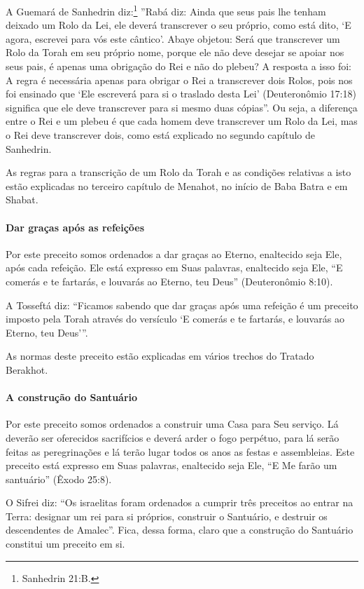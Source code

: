 A Guemará de Sanhedrin diz:\footnote{Sanhedrin 21:B.} ''Rabá diz: Ainda que
seus pais lhe tenham deixado um Rolo da Lei, ele deverá transcrever o seu próprio,
como está dito, `E agora, escrevei para vós este cântico'. Abaye
objetou: Será que transcrever um Rolo da Torah em seu próprio nome,
porque ele não deve desejar se apoiar nos seus pais, é apenas uma
obrigação do Rei e não do plebeu? A resposta a isso foi: A regra é
necessária apenas para obrigar o Rei a transcrever dois Rolos, pois nos
foi ensinado que `Ele escreverá para si o traslado desta Lei'
(Deuteronômio 17:18) significa que ele deve transcrever para si mesmo
duas cópias''. Ou seja, a diferença entre o Rei e um plebeu é que cada
homem deve transcrever um Rolo da Lei, mas o Rei deve transcrever dois,
como está explicado no segundo capítulo de Sanhedrin.

As regras para a transcrição de um Rolo da Torah e as condições
relativas a isto estão explicadas no terceiro capítulo de Menahot, no
início de Baba Batra e em Shabat.

\paragraph{Dar graças após as refeições}

Por este preceito somos ordenados a dar graças ao Eterno, enaltecido
seja Ele, após cada refeição. Ele está expresso em Suas palavras,
enaltecido seja Ele, ``E comerás e te fartarás, e louvarás ao Eterno,
teu Deus'' (Deuteronômio 8:10).

A Tosseftá diz: ``Ficamos sabendo que dar graças após uma refeição é um
preceito imposto pela Torah através do versículo `E comerás e te
fartarás, e louvarás ao Eterno, teu Deus'''.

As normas deste preceito estão explicadas em vários trechos do Tratado
Berakhot.

\paragraph{A construção do Santuário}

Por este preceito somos ordenados a construir uma Casa para Seu serviço.
Lá deverão ser oferecidos sacrifícios e deverá arder o fogo perpétuo,
para lá serão feitas as peregrinações e lá terão lugar todos os anos as
festas e assembleias. Este preceito está expresso em Suas palavras,
enaltecido seja Ele, ``E Me farão um santuário'' (Êxodo 25:8).

O Sifrei diz: ``Os israelitas foram ordenados a cumprir três preceitos
ao entrar na Terra: designar um rei para si próprios, construir o
Santuário, e destruir os descendentes de Amalec''. Fica, dessa forma,
claro que a construção do Santuário constitui um preceito em si.

